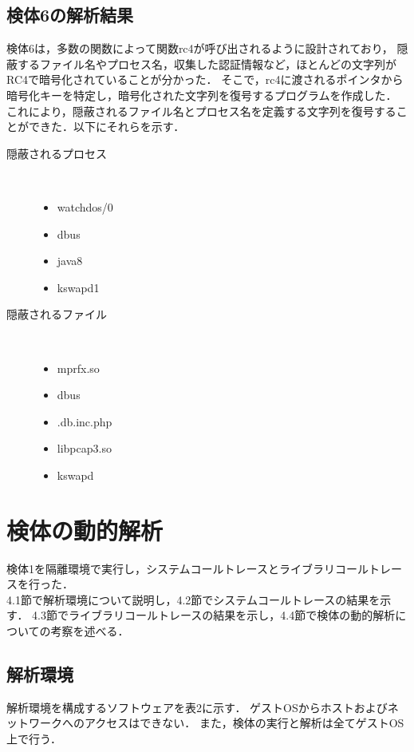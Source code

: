 \documentclass[submit,techreq,noauthor]{eco}	%
\begin{document}
\subsection{検体6の解析結果}
検体6は，多数の関数によって関数rc4が呼び出されるように設計されており，
隠蔽するファイル名やプロセス名，収集した認証情報など，ほとんどの文字列がRC4で暗号化されていることが分かった．
そこで，rc4に渡されるポインタから暗号化キーを特定し，暗号化された文字列を復号するプログラムを作成した．
これにより，隠蔽されるファイル名とプロセス名を定義する文字列を復号することができた．以下にそれらを示す．
\begin{description}
  \item[隠蔽されるプロセス]　
  \begin{itemize}
    \item \lbrack watchdos/0\rbrack
    \item dbus
    \item java8
    \item \lbrack kswapd1\rbrack
  \end{itemize}
  \item[隠蔽されるファイル]　
  \begin{itemize}
    \item mprfx.so
    \item dbus
    \item .db.inc.php
    \item libpcap3.so
    \item kswapd\\
  \end{itemize}
\end{description}

\section{検体の動的解析}
検体1を隔離環境で実行し，システムコールトレースとライブラリコールトレースを行った．\\
\indent
4.1節で解析環境について説明し，4.2節でシステムコールトレースの結果を示す．
4.3節でライブラリコールトレースの結果を示し，4.4節で検体の動的解析についての考察を述べる．

\subsection{解析環境}
解析環境を構成するソフトウェアを表2に示す．
ゲストOSからホストおよびネットワークへのアクセスはできない．
また，検体の実行と解析は全てゲストOS上で行う．
\end{document}
